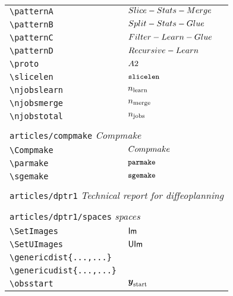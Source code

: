 \begin{longtable}{lll}
 {\color[rgb]{0.5,0.5,0.5}\texttt{\textbackslash patternA}} & $Slice-Stats-Merge$ & \\ 
 {\color[rgb]{0.5,0.5,0.5}\texttt{\textbackslash patternB}} & $Split-Stats-Glue$ & \\ 
 {\color[rgb]{0.5,0.5,0.5}\texttt{\textbackslash patternC}} & $Filter-Learn-Glue$ & \\ 
 {\color[rgb]{0.5,0.5,0.5}\texttt{\textbackslash patternD}} & $Recursive-Learn$ & \\ 
 {\color[rgb]{0.5,0.5,0.5}\texttt{\textbackslash proto}} & $A2$ & \\ 
 {\color[rgb]{0.5,0.5,0.5}\texttt{\textbackslash slicelen}} & $\texttt{\small slicelen}$ & \\ 
 {\color[rgb]{0.5,0.5,0.5}\texttt{\textbackslash njobslearn}} & $n_{\text{learn}}$ & \\ 
 {\color[rgb]{0.5,0.5,0.5}\texttt{\textbackslash njobsmerge}} & $n_{\text{merge}}$ & \\ 
 {\color[rgb]{0.5,0.5,0.5}\texttt{\textbackslash njobstotal}} & $n_{\text{jobs}}$ & \\ 
  &  & \\ 
 \multicolumn{3}{l}{{\color[rgb]{0.5,0.5,0.5}\texttt{articles/compmake}} \emph{Compmake}}\\ 
 \hline
{\color[rgb]{0.5,0.5,0.5}\texttt{\textbackslash Compmake}} & ${Compmake}$ & \\ 
 {\color[rgb]{0.5,0.5,0.5}\texttt{\textbackslash parmake}} & $\texttt{\small parmake}$ & \\ 
 {\color[rgb]{0.5,0.5,0.5}\texttt{\textbackslash sgemake}} & $\texttt{\small sgemake}$ & \\ 
  &  & \\ 
 \multicolumn{3}{l}{{\color[rgb]{0.5,0.5,0.5}\texttt{articles/dptr1}} \emph{Technical report for diffeoplanning}}\\ 
 \hline
 &  & \\ 
 \multicolumn{3}{l}{{\color[rgb]{0.5,0.5,0.5}\texttt{articles/dptr1/spaces}} \emph{spaces}}\\ 
 \hline
{\color[rgb]{0.5,0.5,0.5}\texttt{\textbackslash SetImages}} & $\mathsf{Im}$ & \\ 
 {\color[rgb]{0.5,0.5,0.5}\texttt{\textbackslash SetUImages}} & $\mathsf{UIm}$ & \\ 
 {\color[rgb]{0.5,0.5,0.5}\texttt{\textbackslash genericdist\{...,...\}}} &  & \\ 
 {\color[rgb]{0.5,0.5,0.5}\texttt{\textbackslash genericudist\{...,...\}}} &  & \\ 
 {\color[rgb]{0.5,0.5,0.5}\texttt{\textbackslash obsstart}} & $\boldsymbol{y}_{\text{start}}$ & \\ 

\end{longtable}
